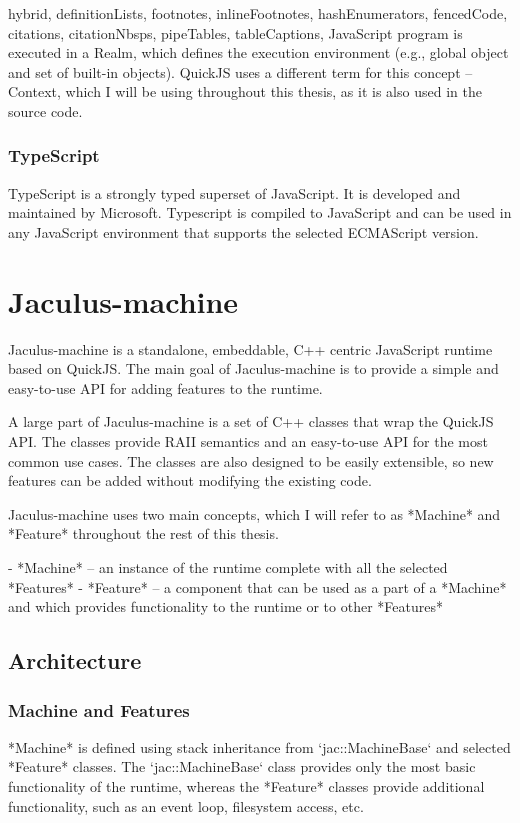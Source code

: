 \documentclass[
  digital,
  oneside,
  nosansbold,
  nocolorbold,
  lof,
  lot
]{fithesis4}
\begin{document}
\begin{markdown*}{%
  hybrid,
  definitionLists,
  footnotes,
  inlineFootnotes,
  hashEnumerators,
  fencedCode,
  citations,
  citationNbsps,
  pipeTables,
  tableCaptions,
}
JavaScript program is executed in a Realm, which defines the execution environment (e.g., global object and set of built-in objects). QuickJS uses a different term for this concept -- Context, which I will be using throughout this thesis, as it is also used in the source code.


\subsection{TypeScript}

TypeScript is a strongly typed superset of JavaScript. It is developed and maintained by Microsoft. Typescript is compiled to JavaScript and can be used in any JavaScript environment that supports the selected ECMAScript version.


\chapter{Jaculus-machine}

Jaculus-machine is a standalone, embeddable, C++ centric JavaScript runtime based on QuickJS. The main goal of Jaculus-machine is to provide a simple and easy-to-use API for adding features to the runtime.

A large part of Jaculus-machine is a set of C++ classes that wrap the QuickJS API. The classes provide RAII semantics and an easy-to-use API for the most common use cases. The classes are also designed to be easily extensible, so new features can be added without modifying the existing code.

Jaculus-machine uses two main concepts, which I will refer to as *Machine* and *Feature* throughout the rest of this thesis.

  - *Machine* -- an instance of the runtime complete with all the selected *Features*
  - *Feature* -- a component that can be used as a part of a *Machine* and which provides functionality to the runtime or to other *Features*

\section{Architecture}

\subsection{Machine and Features}

*Machine* is defined using stack inheritance from `jac::MachineBase` and selected *Feature* classes. The `jac::MachineBase` class provides only the most basic functionality of the runtime, whereas the *Feature* classes provide additional functionality, such as an event loop, filesystem access, etc.


\end{markdown*}
\end{document}
